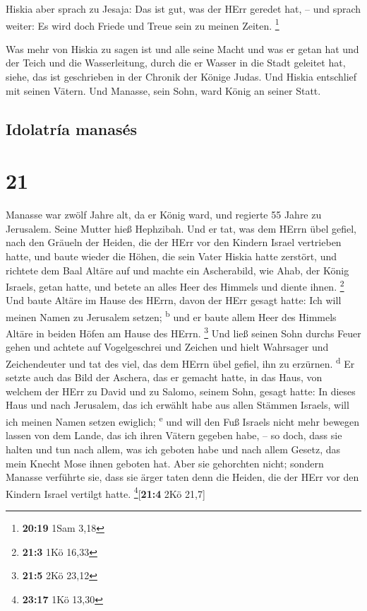 Hiskia aber sprach zu Jesaja: Das ist gut, was der HErr
geredet hat, -- und sprach weiter: Es wird doch Friede und Treue sein zu
meinen Zeiten. \footnote{\textbf{20:19} 1Sam 3,18}

 Was mehr von Hiskia zu sagen ist und alle seine Macht
und was er getan hat und der Teich und die Wasserleitung, durch die er
Wasser in die Stadt geleitet hat, siehe, das ist geschrieben in der
Chronik der Könige Judas.  Und Hiskia entschlief mit
seinen Vätern. Und Manasse, sein Sohn, ward König an seiner Statt.

\hypertarget{idolatruxeda-manasuxe9s}{%
\subsection{Idolatría manasés}\label{idolatruxeda-manasuxe9s}}

\hypertarget{section-20}{%
\section{21}\label{section-20}}

 Manasse war zwölf Jahre alt, da er König ward, und
regierte 55 Jahre zu Jerusalem. Seine Mutter hieß Hephzibah.
 Und er tat, was dem HErrn übel gefiel, nach den Gräueln
der Heiden, die der HErr vor den Kindern Israel vertrieben hatte,
 und baute wieder die Höhen, die sein Vater Hiskia hatte
zerstört, und richtete dem Baal Altäre auf und machte ein Ascherabild,
wie Ahab, der König Israels, getan hatte, und betete an alles Heer des
Himmels und diente ihnen. \footnote{\textbf{21:3} 1Kö 16,33}
 Und baute Altäre im Hause des HErrn, davon der HErr
gesagt hatte: Ich will meinen Namen zu Jerusalem setzen;
\textsuperscript{b}  und er baute allem Heer des Himmels
Altäre in beiden Höfen am Hause des HErrn. \footnote{\textbf{21:5} 2Kö
  23,12}  Und ließ seinen Sohn durchs Feuer gehen und
achtete auf Vogelgeschrei und Zeichen und hielt Wahrsager und
Zeichendeuter und tat des viel, das dem HErrn übel gefiel, ihn zu
erzürnen. \textsuperscript{d}  Er setzte auch das Bild der
Aschera, das er gemacht hatte, in das Haus, von welchem der HErr zu
David und zu Salomo, seinem Sohn, gesagt hatte: In dieses Haus und nach
Jerusalem, das ich erwählt habe aus allen Stämmen Israels, will ich
meinen Namen setzen ewiglich; \textsuperscript{e}  und
will den Fuß Israels nicht mehr bewegen lassen von dem Lande, das ich
ihren Vätern gegeben habe, -- so doch, dass sie halten und tun nach
allem, was ich geboten habe und nach allem Gesetz, das mein Knecht Mose
ihnen geboten hat.  Aber sie gehorchten nicht; sondern
Manasse verführte sie, dass sie ärger taten denn die Heiden, die der
HErr vor den Kindern Israel vertilgt hatte. \footnote{\textbf{23:17} 1Kö
  13,30}{[}\textbf{21:4} 2Kö 21,7{]}

